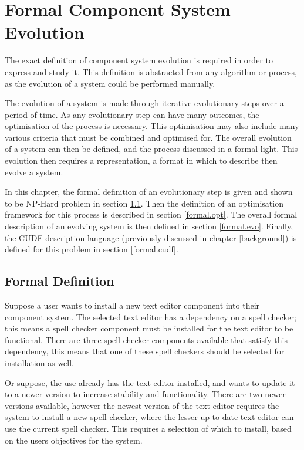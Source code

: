 \chapter{Formal Component System Evolution}
\label{cdr}
The exact definition of component system evolution is required in order to express and study it.
This definition is abstracted from any algorithm or process, as the evolution of a system could be performed manually.

The evolution of a system is made through iterative evolutionary steps over a period of time.
As any evolutionary step can have many outcomes, the optimisation of the process is necessary.
This optimisation may also include many various criteria that must be combined and optimised for.
The overall evolution of a system can then be defined, and the process discussed in a formal light.
This evolution then requires a representation, a format in which to describe then evolve a system.

In this chapter, the formal definition of an evolutionary step is given and shown to be NP-Hard problem in section \ref{formal.step}.
Then the definition of an optimisation framework for this process is described in section \ref{formal.opt}.
The overall formal description of an evolving system is then defined in section \ref{formal.evo}.
Finally, the CUDF description language (previously discussed in chapter \ref{background}) is defined for this problem in section \ref{formal.cudf}.

\section{Formal Definition}
\label{formal.step}
Suppose a user wants to install a new text editor component into their component system.
The selected text editor has a dependency on a spell checker;
this means a spell checker component must be installed for the text editor to be functional.
There are three spell checker components available that satisfy this dependency,
this means that one of these spell checkers should be selected for installation as well.

Or suppose, the use already has the text editor installed, and wants to update it to a newer version to increase stability and functionality.
There are two newer versions available, however the newest version of the text editor requires the system to install a new spell checker,
where the lesser up to date text editor can use the current spell checker.
This requires a selection of which to install, based on the users objectives for the system.

